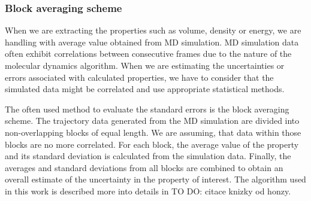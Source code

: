 \subsubsection{Block averaging scheme}
When we are extracting the properties such as volume, density or energy, we are handling with average value obtained from MD simulation. MD simulation data often exhibit correlations between consecutive frames due to the nature of the molecular dynamics algorithm. When we are estimating the uncertainties or errors associated with calculated properties, we have to consider that the simulated data might be correlated and use appropriate statistical methods. 

The often used method to evaluate the standard errors is the block averaging scheme. The trajectory data generated from the MD simulation are divided into non-overlapping blocks of equal length. We are assuming, that data within those blocks are no more correlated. For each block, the average value of the property and its standard deviation is calculated from the simulation data. Finally, the averages and standard deviations from all blocks are combined to obtain an overall estimate of the uncertainty in the property of interest. The algorithm used in this work is described more into details in TO DO: citace knizky od honzy\cite{}.


